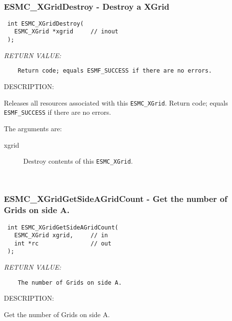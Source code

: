  
\mbox{}\hrulefill\ 
 
\subsubsection [ESMC\_XGridDestroy] {ESMC\_XGridDestroy - Destroy a XGrid}


  
\begin{verbatim} int ESMC_XGridDestroy(
   ESMC_XGrid *xgrid     // inout
 );
 \end{verbatim}{\em RETURN VALUE:}
\begin{verbatim}    Return code; equals ESMF_SUCCESS if there are no errors.\end{verbatim}
{\sf DESCRIPTION:\\ }


  
    Releases all resources associated with this {\tt ESMC\_XGrid}.
      Return code; equals {\tt ESMF\_SUCCESS} if there are no errors.
  
    The arguments are:
    \begin{description}
    \item[xgrid]
      Destroy contents of this {\tt ESMC\_XGrid}.
    \end{description}
   
 
\mbox{}\hrulefill\ 
 
\subsubsection [ESMC\_XGridGetSideAGridCount] {ESMC\_XGridGetSideAGridCount - Get the number of Grids on side A.}


  
\begin{verbatim} int ESMC_XGridGetSideAGridCount(
   ESMC_XGrid xgrid,     // in
   int *rc               // out
 );
 \end{verbatim}{\em RETURN VALUE:}
\begin{verbatim}    The number of Grids on side A. \end{verbatim}
{\sf DESCRIPTION:\\ }


  
    Get the number of Grids on side A. 
  

